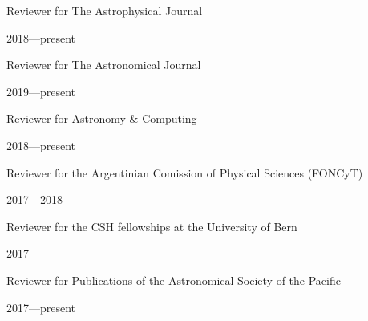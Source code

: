 \documentclass[12pt, a4paper]{article} %
\begin{document}
\begin{minipage}[t]{0.7\textwidth}
\begin{flushleft}%
  \setlength{\leftskip}{0.2cm}%
Reviewer for The Astrophysical Journal
\end{flushleft}
\end{minipage}
\begin{minipage}[t]{0.3\textwidth}
\hfill 2018---present
\end{minipage}

\begin{minipage}[t]{0.7\textwidth}
\begin{flushleft}%
  \setlength{\leftskip}{0.2cm}%
Reviewer for The Astronomical Journal
\end{flushleft}
\end{minipage}
\begin{minipage}[t]{0.3\textwidth}
\hfill 2019---present
\end{minipage}

\begin{minipage}[t]{0.7\textwidth}
\begin{flushleft}%
  \setlength{\leftskip}{0.2cm}%
Reviewer for Astronomy \& Computing
\end{flushleft}
\end{minipage}
\begin{minipage}[t]{0.3\textwidth}
\hfill 2018---present
\end{minipage}

\begin{minipage}[t]{0.7\textwidth}
\begin{flushleft}%
  \setlength{\leftskip}{0.2cm}%
Reviewer for the Argentinian Comission of Physical Sciences (FONCyT)
\end{flushleft}
\end{minipage}
\begin{minipage}[t]{0.3\textwidth}
\hfill 2017---2018
\end{minipage}

\begin{minipage}[t]{0.7\textwidth}
\begin{flushleft}%
  \setlength{\leftskip}{0.2cm}%
Reviewer for the CSH fellowships at the University of Bern 
\end{flushleft}
\end{minipage}
\begin{minipage}[t]{0.3\textwidth}
\hfill 2017
\end{minipage}

\begin{minipage}[t]{0.7\textwidth}
\begin{flushleft}%
  \setlength{\leftskip}{0.2cm}%
Reviewer for Publications of the Astronomical Society of the Pacific 
\end{flushleft}
\end{minipage}
\begin{minipage}[t]{0.3\textwidth}
\hfill 2017---present
\end{minipage}
\end{document}
